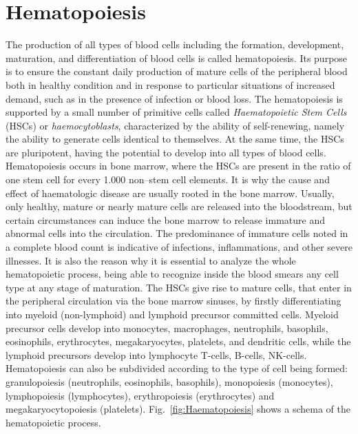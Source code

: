 \documentclass[final,a4paper,12pt,english]{UnicaPhdThesis3}
\begin{document}
{

 


\appendix
\chapter{Hematopoiesis}\label{appendixA}
The production of all types of blood cells including the formation, development, maturation, and differentiation of blood cells is called hematopoiesis. Its purpose is to ensure the constant daily production of mature cells of the peripheral blood both in healthy condition and in response to particular situations of increased demand, such as in the presence of infection or blood loss. The hematopoiesis is supported by a small number of primitive cells called \textit{Haematopoietic Stem Cells} (\acs{HSC}s) or \textit{haemocytoblasts}, characterized by the ability of self-renewing, namely the ability to generate cells identical to themselves. At the same time, the HSCs are pluripotent, having the potential to develop into all types of blood cells. Hematopoiesis occurs in bone marrow, where the HSCs are present in the ratio of one stem cell for every 1.000 non–stem cell elements. It is why the cause and effect of haematologic disease are usually rooted in the bone marrow. Usually, only healthy, mature or nearly mature cells are released into the bloodstream, but certain circumstances can induce the bone marrow to release immature and abnormal cells into the circulation. The predominance of immature cells noted in a complete blood count is indicative of infections, inflammations, and other severe illnesses. It is also the reason why it is essential to analyze the whole hematopoietic process, being able to recognize inside the blood smears any cell type at any stage of maturation. The HSCs give rise to mature cells, that enter in the peripheral circulation via the bone marrow sinuses, by firstly differentiating into myeloid (non-lymphoid) and lymphoid precursor committed cells. Myeloid precursor cells develop into monocytes, macrophages, neutrophils, basophils, eosinophils, erythrocytes, megakaryocytes, platelets, and dendritic cells, while the lymphoid precursors develop into lymphocyte T-cells, B-cells, NK-cells. Hematopoiesis can also be subdivided according to the type of cell being formed: granulopoiesis (neutrophils, eosinophils, basophils), monopoiesis (monocytes), lymphopoiesis (lymphocytes), erythropoiesis (erythrocytes) and megakaryocytopoiesis (platelets). Fig.~\ref{fig:Haematopoiesis} shows a schema of the hematopoietic process.

}
\end{document}

